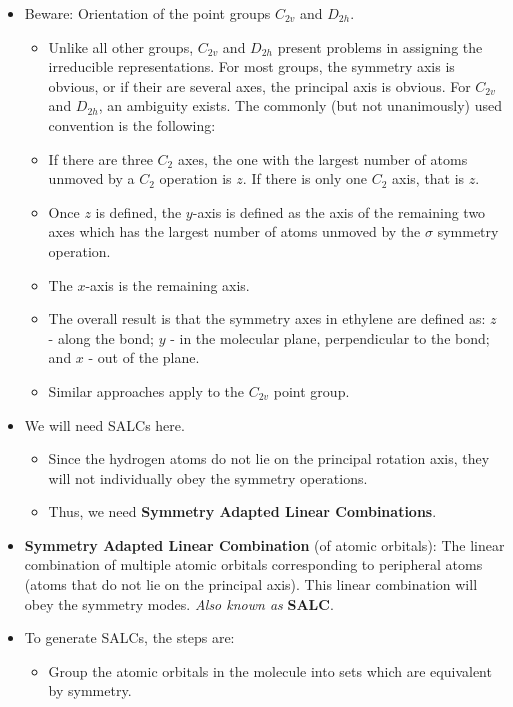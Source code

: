 \documentclass[../notes.tex]{subfiles}
\begin{document}
\begin{itemize}
    \item Beware: Orientation of the point groups $C_{2v}$ and $D_{2h}$.
    \begin{itemize}
        \item Unlike all other groups, $C_{2v}$ and $D_{2h}$ present problems in assigning the irreducible representations. For most groups, the symmetry axis is obvious, or if their are several axes, the principal axis is obvious. For $C_{2v}$ and $D_{2h}$, an ambiguity exists. The commonly (but not unanimously) used convention is the following:
        \item If there are three $C_2$ axes, the one with the largest number of atoms unmoved by a $C_2$ operation is $z$. If there is only one $C_2$ axis, that is $z$.
        \item Once $z$ is defined, the $y$-axis is defined as the axis of the remaining two axes which has the largest number of atoms unmoved by the $\sigma$ symmetry operation.
        \item The $x$-axis is the remaining axis.
        \item The overall result is that the symmetry axes in ethylene are defined as: $z$ - along the  bond; $y$ - in the molecular plane, perpendicular to the  bond; and $x$ - out of the plane.
        \item Similar approaches apply to the $C_{2v}$ point group.
    \end{itemize}
    \item We will need SALCs here.
    \begin{itemize}
        \item Since the hydrogen atoms do not lie on the principal rotation axis, they will not individually obey the symmetry operations.
        \item Thus, we need \textbf{Symmetry Adapted Linear Combinations}.
    \end{itemize}
    \item \textbf{Symmetry Adapted Linear Combination} (of atomic orbitals): The linear combination of multiple atomic orbitals corresponding to peripheral atoms (atoms that do not lie on the principal axis). This linear combination will obey the symmetry modes. \emph{Also known as} \textbf{SALC}.
    \item To generate SALCs, the steps are:
    \begin{itemize}
        \item Group the atomic orbitals in the molecule into sets which are equivalent by symmetry.

\end{itemize}
\end{itemize}
\end{document}
